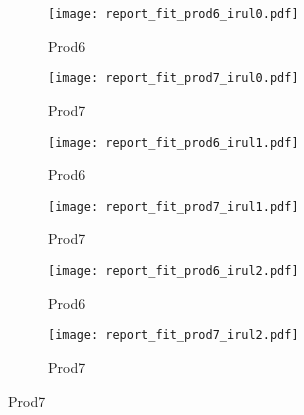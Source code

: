 \documentclass[a4paper,12pt]{article}
\begin{document}





\begin{figure}[htbp]
	\begin{subfigure}[]{0.5\textwidth}
		\centering
		\texttt{[image: report\_fit\_prod6\_irul0.pdf]} 
	    \caption{Prod6}
	\end{subfigure}%
	\hfill
	\begin{subfigure}[]{0.5\textwidth}
		\centering
		\texttt{[image: report\_fit\_prod7\_irul0.pdf]} 
	    \caption{Prod7}
	\end{subfigure}%

	\begin{subfigure}[]{0.5\textwidth}
		\centering
		\texttt{[image: report\_fit\_prod6\_irul1.pdf]} 
	    \caption{Prod6}
	\end{subfigure}%
	\hfill
	\begin{subfigure}[]{0.5\textwidth}
		\centering
		\texttt{[image: report\_fit\_prod7\_irul1.pdf]} 
	    \caption{Prod7}
	\end{subfigure}%
	
	\begin{subfigure}[]{0.5\textwidth}
		\centering
		\texttt{[image: report\_fit\_prod6\_irul2.pdf]} 
	    \caption{Prod6}
	\end{subfigure}%
	\hfill
	\begin{subfigure}[]{0.5\textwidth}
		\centering
		\texttt{[image: report\_fit\_prod7\_irul2.pdf]} 
	    \caption{Prod7}
	\end{subfigure}%
\end{figure}
\end{document}
